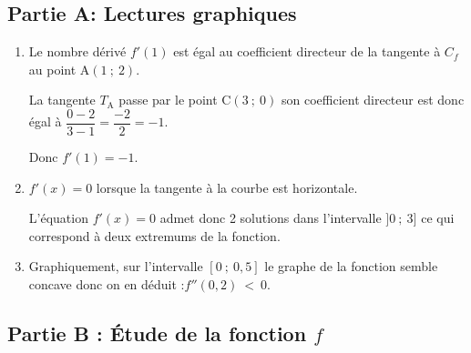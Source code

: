 
\medskip

\subsection*{Partie A: Lectures graphiques}


\begin{enumerate}
\item Le nombre dérivé $f'(1)$ est égal au coefficient directeur de la tangente à $C_{f}$ au point $\mathrm{A}(1 ~;~ 2)$.

La tangente $T_{\mathrm{A}}$ passe par le point $\mathrm{C}(3 ~;~ 0)$ son coefficient directeur est donc égal à $\dfrac{0-2}{3-1}= \dfrac{-2}{2}=-1$.

Donc $f'(1)= - 1$.
\item  $f'(x)=0$ lorsque la tangente à la courbe est horizontale.

L'équation $f'(x)=0$ admet donc 2 solutions dans l'intervalle $]0 ~;~ 3]$ ce qui correspond à deux extremums de la fonction.
\item Graphiquement, sur l'intervalle $[0~;~0,5]$ le graphe de la fonction semble concave donc on en déduit :\quad $f''(0,2)~<~0$.
\end{enumerate}

\subsection*{ Partie B : Étude de la fonction \boldmath $f$\unboldmath}

%
%

